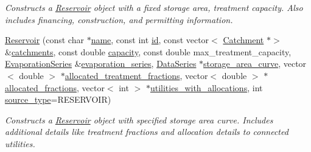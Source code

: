 \begin{DoxyCompactItemize}
\begin{DoxyCompactList}\small\item\em Constructs a \mbox{\hyperlink{classReservoir}{Reservoir}} object with a fixed storage area, treatment capacity. Also includes financing, construction, and permitting information. \end{DoxyCompactList}\item 
\mbox{\hyperlink{classReservoir_a1a6f078a9565dcb65843d3575bdd4172}{Reservoir}} (const char $\ast$\mbox{\hyperlink{classWaterSource_a846ea74c5b453d014f594d41fee8c765}{name}}, const int \mbox{\hyperlink{classWaterSource_a6eafe5dfefd317877d1244e8a7c6e742}{id}}, const vector$<$ \mbox{\hyperlink{classCatchment}{Catchment}} $\ast$$>$ \&\mbox{\hyperlink{classWaterSource_a8c18c34f23f8a06685c1d12f462ed830}{catchments}}, const double \mbox{\hyperlink{classWaterSource_a2ec257b415b248214a8bce7fc5267723}{capacity}}, const double max\+\_\+treatment\+\_\+capacity, \mbox{\hyperlink{classEvaporationSeries}{Evaporation\+Series}} \&\mbox{\hyperlink{classReservoir_a2d2d9b302c13703309bb798d24136810}{evaporation\+\_\+series}}, \mbox{\hyperlink{classDataSeries}{Data\+Series}} $\ast$\mbox{\hyperlink{classReservoir_a46bd5b750963dfa9a57b247fd77ab8ff}{storage\+\_\+area\+\_\+curve}}, vector$<$ double $>$ $\ast$\mbox{\hyperlink{classWaterSource_aa73fe10cfc6579b2fb79529e1dde5140}{allocated\+\_\+treatment\+\_\+fractions}}, vector$<$ double $>$ $\ast$\mbox{\hyperlink{classWaterSource_a2f6655a80c4847fe039987255d9d998c}{allocated\+\_\+fractions}}, vector$<$ int $>$ $\ast$\mbox{\hyperlink{classWaterSource_ac345583fc2d0f7e1db31ee40244d7ace}{utilities\+\_\+with\+\_\+allocations}}, int \mbox{\hyperlink{classWaterSource_afdd12c29fc74ea21dff1f1be9b8c2b7b}{source\+\_\+type}}=R\+E\+S\+E\+R\+V\+O\+IR)
\begin{DoxyCompactList}\small\item\em Constructs a \mbox{\hyperlink{classReservoir}{Reservoir}} object with specified storage area curve. Includes additional details like treatment fractions and allocation details to connected utilities. \end{DoxyCompactList}\item 
$$
\end{DoxyCompactItemize}
